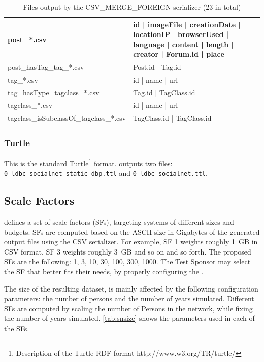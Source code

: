 \begin{table}[htbp]
{\begin{tabular}{|p{4.3cm}|p{12.4cm}|}
        post\_*.csv & id | imageFile | creationDate | locationIP | browserUsed | language | content | length | creator | Forum.id | place \\
        \hline
        post\_hasTag\_tag\_*.csv & Post.id | Tag.id \\
        \hline
        tag\_*.csv & id | name | url \\
        \hline
        tag\_hasType\_tagclass\_*.csv & Tag.id | TagClass.id \\
        \hline
        tagclass\_*.csv & id | name | url \\
        \hline
        tagclass\_isSubclassOf\_tagclass\_*.csv & TagClass.id | TagClass.id \\
        \hline
    \end{tabular}}
    \caption{Files output by the CSV\_MERGE\_FOREIGN serializer (23 in total)}
    \label{table:csv_merge_foreign}
\end{table}

\subsubsection{Turtle}

This is the standard Turtle\footnote{Description of
the Turtle RDF format http://www.w3.org/TR/turtle/} format. \datagen outputs
two files: \texttt{0\_ldbc\_socialnet\_static\_dbp.ttl} and \texttt{0\_ldbc\_socialnet.ttl}.


\subsection{Scale Factors}

\ldbcsnb defines a set of scale factors (SFs), targeting systems of different
sizes and budgets.  SFs are computed based on the ASCII size in Gigabytes of
the generated output files using the CSV serializer. For example, SF 1 weights roughly 1~GB in CSV
format, SF 3 weights roughly 3~GB and so on and so forth.  The proposed SFs are
the following: 1, 3, 10, 30, 100, 300, 1000. The Test Sponsor may select the SF
that better fits their needs, by properly configuring the \datagen.

The size of the resulting dataset, is mainly affected by the following
configuration parameters: the number of persons and the number of years
simulated. Different SFs are computed by scaling the number of Persons in
the network, while fixing the number of years simulated.
\autoref{tab:snsize} shows the parameters used in each of the SFs.

